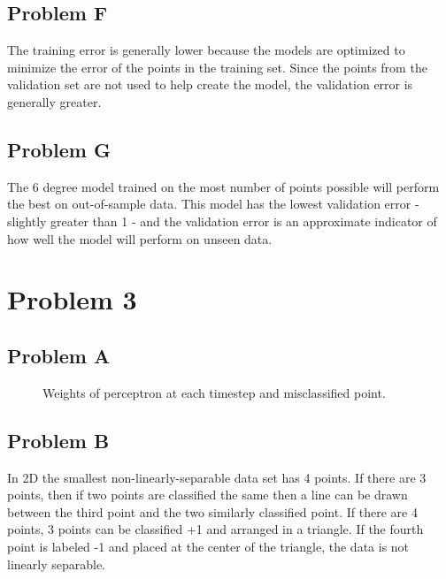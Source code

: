 \documentclass[12pt]{article} %
\begin{document}
\subsection{Problem F}
The training error is generally lower because the models are optimized to minimize the error of the points in the training set. Since the points from the validation set are not used to help create the model, the validation error is generally greater.

\subsection{Problem G}
The 6 degree model trained on the most number of points possible will perform the best on out-of-sample data. This model has the lowest validation error - slightly greater than 1 - and the validation error is an approximate indicator of how well the model will perform on unseen data.

\section{Problem 3}

\subsection{Problem A}

\begin{figure}[H]
	\caption{Weights of perceptron at each timestep and misclassified point.}
\end{figure}

\subsection{Problem B}
In 2D the smallest non-linearly-separable  data set has 4 points. If there are 3 points, then if two points are classified the same then a line can be drawn between the third point and the two similarly classified point. If there are 4 points,  3 points can be classified +1 and arranged in a triangle. If the fourth point is labeled -1 and placed at the center of the triangle, the data is not linearly separable.
\end{document}
